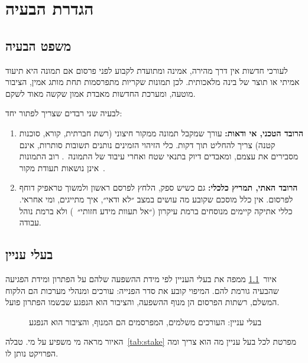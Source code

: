 \chapter{הגדרת הבעיה}\label{ch:problem}

\section{משפט הבעיה}
\begin{keybox}
לעורכי חדשות אין דרך מהירה, אמינה ומתועדת לקבוע לפני פרסום אם תמונה היא תיעוד אמיתי או תוצר של בינה מלאכותית. לכן תמונות שקריות מתפרסמות תחת מותג אמין, הציבור מוטעה, ומערכת החדשות מאבדת אמון שקשה מאוד לשקם.
\end{keybox}

לבעיה שני רבדים שצריך לפתור יחד:
\begin{enumerate}
\item \textbf{הרובד הטכני, אי ודאות:} עורך שמקבל תמונה ממקור חיצוני (רשת חברתית, קורא, סוכנות קטנה) צריך להחליט תוך דקות. כלי הזיהוי הזמינים נותנים תשובות סותרות, אינם מסבירים את עצמם, ומאבדים דיוק בתנאי שטח ואחרי עיבוד של התמונה~\cite{ren2025,corvi2023}. רוב התמונות אינן נושאות תעודת מקור~\cite{iptc2026}.
\item \textbf{הרובד האתי, תמריץ כלכלי:} גם כשיש ספק, הלחץ לפרסם ראשון ולמשוך טראפיק דוחף לפרסום. אין כלל מוסכם שקובע מה עושים במצב ״לא ודאי״, איך מתייגים, ומי אחראי. כללי אתיקה קיימים מנוסחים ברמת עיקרון (״אל תעוות מידע חזותי״~\cite{spj2014}) ולא ברמת נוהל עבודה.
\end{enumerate}

\section{בעלי עניין}
איור~\ref{fig:stake} ממפה את בעלי העניין לפי מידת ההשפעה שלהם על הפתרון ומידת הפגיעה שהבעיה גורמת להם. המיפוי קובע את סדר הפנייה: עורכים ומנהלי מערכות הם הלקוח המשלם, רשתות הפרסום הן מנוף ההשפעה, והציבור הוא הנפגע שבשמו הפתרון פועל.

\begin{figure}[!htb]
\begin{ltrdiagram}

\end{ltrdiagram}
\caption{בעלי עניין: העורכים משלמים, המפרסמים הם המנוף, והציבור הוא הנפגע}\label{fig:stake}
\end{figure}

האיור מראה מי משפיע על מי. טבלה~\ref{tab:stake} מפרטת לכל בעל עניין מה הוא צריך ומה הפרויקט נותן לו.


